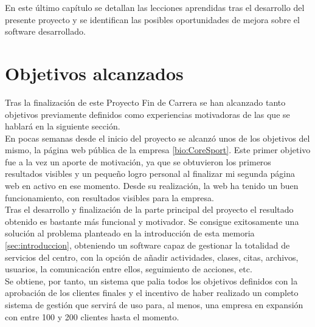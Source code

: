 

En este último capí­tulo se detallan las lecciones aprendidas tras el desarrollo del presente proyecto y se identifican las posibles oportunidades de mejora sobre el software desarrollado.

\section{Objetivos alcanzados}

Tras la finalización de este Proyecto Fin de Carrera se han alcanzado tanto objetivos previamente definidos como experiencias motivadoras de las que se hablará en la siguiente sección. \\ 

En pocas semanas desde el inicio del proyecto se alcanzó unos de los objetivos del mismo, la página web pública de la empresa \ref{bio:CoreSport}. Este primer objetivo fue a la vez un aporte de motivación, ya que se obtuvieron los primeros resultados visibles y un pequeño logro personal al finalizar mi segunda página web en activo en ese momento. Desde su realización, la web ha tenido un buen funcionamiento, con resultados visibles para la empresa. \\

Tras el desarrollo y finalización de la parte principal del proyecto el resultado obtenido es bastante más funcional y motivador. Se consigue exitosamente una solución al problema planteado en la introducción de esta memoria \ref{sec:introduccion}, obteniendo un software capaz de gestionar la totalidad de servicios del centro, con la opción de añadir actividades, clases, citas, archivos, usuarios, la comunicación entre ellos, seguimiento de acciones, etc. \\

Se obtiene, por tanto, un sistema que palia todos los objetivos definidos con la aprobación de los clientes finales y el incentivo de haber realizado un completo sistema de gestión que servirá de uso para, al menos, una empresa en expansión con entre 100 y 200 clientes hasta el momento.


